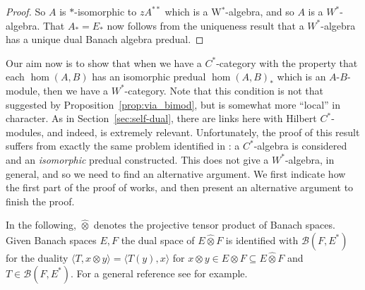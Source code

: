 \documentclass[a4paper,11pt]{article}
\theoremstyle{plain}
\theoremstyle{remark}
\newcommand{\mc}[1]{\mathcal{#1}}
\newcommand{\ip}[2]{{\langle {#1} , {#2} \rangle}}
\newcommand{\proten}{\widehat\otimes}
\begin{document}
\begin{proof}
So $A$ is $*$-isomorphic to $zA^{**}$ which is a W$^*$-algebra, and so $A$ is a $W^*$-algebra.  That $A_* = E_*$ now follows from the uniqueness result \cite[Theorem~5.2]{DHW_conditions_wstar_top} that a $W^*$-algebra has a unique dual Banach algebra predual.
\end{proof}

Our aim now is to show that when we have a $C^*$-category with the property that each $\hom(A,B)$ has an isomorphic predual $\hom(A,B)_*$ which is an $A$-$B$-module, then we have a $W^*$-category.  Note that this condition is not that suggested by Proposition~\ref{prop:via_bimod}, but is somewhat more ``local'' in character.  As in Section~\ref{sec:self-dual}, there are links here with Hilbert $C^*$-modules, and indeed, \cite[Theorem~2.6]{Schweizer_HilbModsPredual} is extremely relevant.  Unfortunately, the proof of this result suffers from exactly the same problem identified in \cite{GLR_Wstar_categories}: a $C^*$-algebra is considered and an \emph{isomorphic} predual constructed.  This does not give a $W^*$-algebra, in general, and so we need to find an alternative argument.  We first indicate how the first part of the proof of \cite[Theorem~2.6]{Schweizer_HilbModsPredual} works, and then present an alternative argument to finish the proof.

In the following, $\proten$ denotes the projective tensor product of Banach spaces.  Given Banach spaces $E,F$ the dual space of $E\proten F$ is identified with $\mc B(F,E^*)$ for the duality $\ip{T}{x\otimes y} = \ip{T(y)}{x}$ for $x\otimes y\in E\otimes F \subseteq E\proten F$ and $T\in\mc B(F,E^*)$.  For a general reference see \cite{Ryan_TensorBook} for example.
\end{document}
